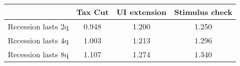 \begin{tabular}{@{}lccc@{}} 
\toprule 
& Tax Cut    & UI extension    & Stimulus check    \\  \midrule 
Recession lasts 2q &0.948  & 1.200  & 1.250     \\ 
Recession lasts 4q &1.003  & 1.213  & 1.296     \\ 
Recession lasts 8q &1.107  & 1.274  & 1.340     \\ 
\end{tabular}  
